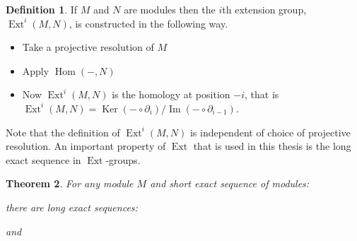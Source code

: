 \documentclass[11pt, a4paper, english]{article}
\newtheorem{theorem}{Theorem}[section]
\theoremstyle{definition}
\newtheorem{defin}[theorem]{Definition}
\DeclareMathOperator{\Hom}{Hom}
\DeclareMathOperator{\Ext}{Ext}
\DeclareMathOperator{\Image}{Im}
\DeclareMathOperator{\Ker}{Ker}
\begin{document}
\begin{appendices}
\begin{defin}
\label{def:Ext}
If $M$ and $N$ are modules then the $i$th extension group, $\Ext^i(M, N)$, is constructed in the following way.
\begin{itemize}
\item Take a projective resolution of $M$
\begin{center}
\end{center}
\item Apply $\Hom(-,N)$
\begin{center}
\end{center}
\item Now $\Ext^i(M, N)$ is the homology at position $-i$, that is $\Ext^i(M,N) = \Ker (- \circ \partial_{i}) / \Image (- \circ \partial_{i-1})$.
\end{itemize}
\end{defin}

Note that the definition of $\Ext^i(M, N)$ is independent of choice of projective resolution. An important property of $\Ext$ that is used in this thesis is the long exact sequence in $\Ext$-groups.

\begin{theorem}
For any module $M$ and short exact sequence of modules:
\begin{center}
\end{center}
there are long exact sequences:
\begin{center}
\end{center}
and
\begin{center}
\end{center}
\end{theorem}

\end{appendices}
\end{document}
